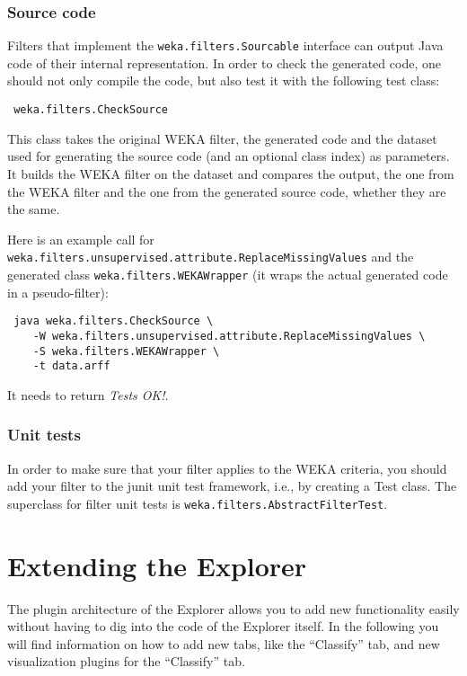 \subsubsection{Source code}
Filters that implement the \texttt{weka.filters.Sourcable} interface can output
Java code of their internal representation. In order to check the generated
code, one should not only compile the code, but also test it with the following
test class:
\begin{verbatim}
 weka.filters.CheckSource
\end{verbatim}
This class takes the original WEKA filter, the generated code and the dataset
used for generating the source code (and an optional class index) as parameters.
It builds the WEKA filter on the dataset and compares the output, the one from
the WEKA filter and the one from the generated source code, whether they are the
same.

Here is an example call for
\texttt{weka.filters.unsupervised.attribute.ReplaceMissingValues} and the
generated class \texttt{weka.filters.WEKAWrapper} (it wraps the actual generated
code in a pseudo-filter):
\begin{verbatim}
 java weka.filters.CheckSource \
    -W weka.filters.unsupervised.attribute.ReplaceMissingValues \
    -S weka.filters.WEKAWrapper \
    -t data.arff
\end{verbatim}
It needs to return \textit{Tests OK!}.

\subsubsection{Unit tests}
In order to make sure that your filter applies to the WEKA criteria, you
should add your filter to the junit unit test framework, i.e., by creating a
Test class. The superclass for filter unit tests is
\texttt{weka.filters.AbstractFilterTest}.


\newpage
\section{Extending the Explorer}
The plugin architecture of the Explorer allows you to add new functionality
easily without having to dig into the code of the Explorer itself. In the
following you will find information on how to add new tabs, like the
``Classify'' tab, and new visualization plugins for the ``Classify'' tab.

